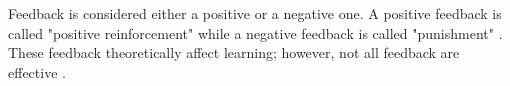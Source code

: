 Feedback is considered either a positive or a negative one. A positive feedback is called "positive reinforcement" while a negative feedback is called "punishment" \cite{brookhart:2008:gef}. These feedback theoretically affect learning; however, not all feedback are effective \cite{brookhart:2008:gef}.


\begin{comment}
\begin{table}[!htbp]   %
\centering
\caption{Table of Feedback Strategies} \vspace{0em}
\begin{tabular}{|p{1in}|p{1.5in}|p{2in}|}
 \hline
\centering
Feedback Strategies May Vary In... & In These Ways... & Recommendations for Good Feedback \\ \hline
    Timing
    & \begin{itemize}
        \item When given
        \item How often
      \end{itemize}
    & \begin{itemize}
        \item Provide immediate feedback for knowledge of facts (right/wrong).
        \item Delay feedback for more comprehensive reviews of student thinking and processing.
        \item Never delay feedback when it would make a difference to students.
        \item Provide feedback as often as is practical, for all major assignments.
        \end{itemize}
        \\ \hline
    Amount
    & \begin{itemize}
        \item How many points made
        \item How much about each point
        \end{itemize}
    & \begin{itemize}
        \item Prioritize - pick the most important points.
        \item Choose points that relate to major learning goals.
        \item Consider the student's developmental level.
        \end{itemize}
        \\ \hline
    Mode

\end{comment}
